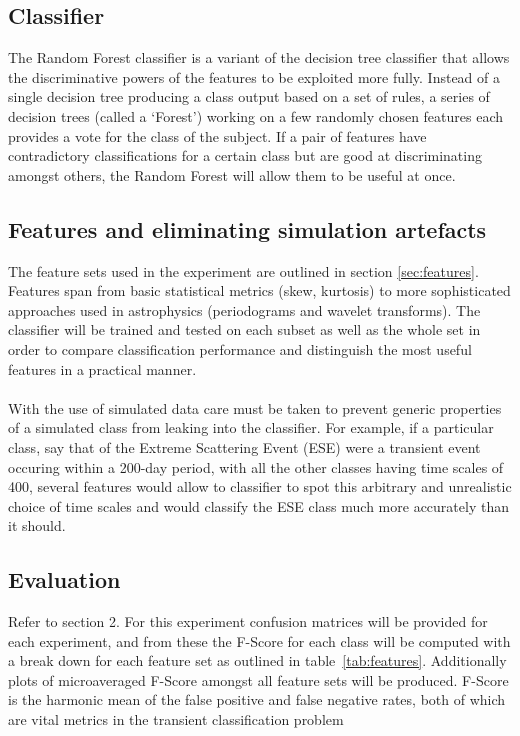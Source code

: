 	\subsection{Classifier}
	The Random Forest classifier is a variant of the decision tree classifier that allows the discriminative powers of the features to be exploited more fully. Instead of a single decision tree producing a class output based on a set of rules, a series of decision trees (called a `Forest') working on a few randomly chosen features each provides a vote for the class of the subject. If a pair of features have contradictory classifications for a certain class but are good at discriminating amongst others, the Random Forest will allow them to be useful at once. \\ %
	
	\subsection{Features and eliminating simulation artefacts}
	The feature sets used in the experiment are outlined in section \ref{sec:features}. Features span from basic statistical metrics (skew, kurtosis) to more sophisticated approaches used in astrophysics (periodograms and wavelet transforms). The classifier will be trained and tested on each subset as well as the whole set in order to compare classification performance and distinguish the most useful features in a practical manner. \\ \\
	With the use of simulated data care must be taken to prevent generic properties of a simulated class from leaking into the classifier. For example, if a particular class, say that of the Extreme Scattering Event (ESE) were a transient event occuring within a 200-day period, with all the other classes having time scales of 400, several features would allow to classifier to spot this arbitrary and unrealistic choice of time scales and would classify the ESE class much more accurately than it should. 
	
	\subsection{Evaluation}
	Refer to section 2. For this experiment confusion matrices will be provided for each experiment, and from these the F-Score for each class will be computed with a break down for each feature set as outlined in table~\ref{tab:features}. Additionally plots of microaveraged F-Score amongst all feature sets will be produced. F-Score is the harmonic mean of the false positive and false negative rates, both of which are vital metrics in the transient classification problem
	
